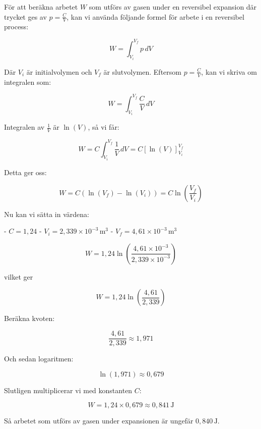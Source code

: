 \documentclass{article}
\begin{document}
För att beräkna arbetet \( W \) som utförs av gasen under en reversibel expansion där trycket ges av \( p = \frac{C}{V} \), kan vi använda följande formel för arbete i en reversibel process:

\[
W = \int_{V_i}^{V_f} p \, dV
\]

Där \( V_i \) är initialvolymen och \( V_f \) är slutvolymen. Eftersom \( p = \frac{C}{V} \), kan vi skriva om integralen som:

\[
W = \int_{V_i}^{V_f} \frac{C}{V} \, dV
\]

Integralen av \( \frac{1}{V} \) är \( \ln(V) \), så vi får:

\[
W = C \int_{V_i}^{V_f} \frac{1}{V} \, dV = C [\ln(V)]_{V_i}^{V_f}
\]

Detta ger oss:

\[
W = C (\ln(V_f) - \ln(V_i)) = C \ln\left(\frac{V_f}{V_i}\right)
\]

Nu kan vi sätta in värdena:

- \( C = 1,24 \)
- \( V_i = 2,339 \times 10^{-3} \, \text{m}^3 \)
- \( V_f = 4,61 \times 10^{-3} \, \text{m}^3 \)

\[
W = 1,24 \ln\left(\frac{4,61 \times 10^{-3}}{2,339 \times 10^{-3}}\right)
\]

vilket ger

\[
W = 1,24 \ln\left(\frac{4,61}{2,339}\right)
\]

Beräkna kvoten:

\[
\frac{4,61}{2,339} \approx 1,971
\]

Och sedan logaritmen:

\[
\ln(1,971) \approx 0,679
\]

Slutligen multiplicerar vi med konstanten \( C \):

\[
W = 1,24 \times 0,679 \approx 0,841 \, \text{J}
\]

Så arbetet som utförs av gasen under expansionen är ungefär \( 0,840 \, \text{J} \).
\end{document}
